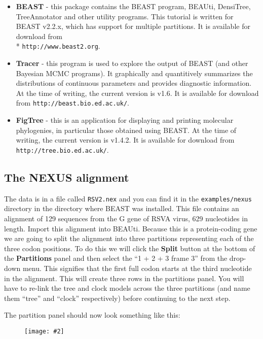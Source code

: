\documentclass[12pt]{article}
\newcommand{\includeimage}[2][]{%
\texttt{[image: \#2]}
}
\newcommand{\BEASTVersion}{2.2.x}
\newcommand{\TracerVersion}{1.6}
\newcommand{\FigTreeVersion}{1.4.2}
\begin{document}
\begin{itemize}
\item {\bf BEAST} - this package contains the BEAST program, BEAUti, DensiTree, TreeAnnotator and other utility programs. This tutorial is written for BEAST v{\BEASTVersion}, which has support for multiple partitions. It is available for download from \\* \texttt{http://www.beast2.org}.
\item {\bf Tracer} - this program is used to explore the output of BEAST (and other Bayesian MCMC programs). It graphically and
quantitively summarizes the distributions of continuous parameters and provides diagnostic information. At the time of
writing, the current version is v{\TracerVersion}. It is available for download from \texttt{http://beast.bio.ed.ac.uk/}.
\item {\bf FigTree} - this is an application for displaying and printing molecular phylogenies, in particular those obtained using
BEAST. At the time of writing, the current version is v{\FigTreeVersion}. It is available for download from \texttt{http://tree.bio.ed.ac.uk/}.
\end{itemize}

\subsection*{The NEXUS alignment}
The data is in a file called \texttt{RSV2.nex} and you can find it in the {\tt examples/nexus} directory in the directory where BEAST was installed. This file contains an alignment of 129 sequences from the G gene of RSVA virus, 629 nucleotides in length. Import this alignment into BEAUti. Because this is a protein-coding gene we are going to split the alignment into three partitions representing each of the three codon positions. To do this we will click the {\bf Split} button at the bottom of the {\bf Partitions} panel and then select the ``1 + 2 + 3 frame 3'' from the drop-down menu. This signifies that the first full codon starts at the third nucleotide in the alignment. This will create three rows in the partitions panel. You will have to re-link the tree and clock models across the three partitions (and name them ``tree'' and ``clock'' respectively) before continuing to the next step.

The partition panel should now look something like this:

\begin{figure}
\centering	
\includeimage[scale=0.4,clip=true,trim=0 0 0 0]{figures/BEAUti_partition}
\label{fig:BEAUti_partition}
\end{figure}
\end{document}
